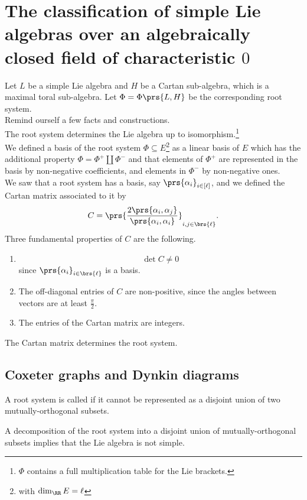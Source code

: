 \documentclass[10pt,a4paper,twoside,openany,hidelinks]{book}
\begin{document}
\chapter{The classification of simple Lie algebras over an algebraically closed field of characteristic $0$}

Let $L$ be a simple Lie algebra and $H$ be a Cartan sub-algebra, which is a maximal toral sub-algebra. Let $\Phi = \Phi\prs{L,H}$ be the corresponding root system.\\
Remind ourself a few facts and constructions.\\
The root system determines the Lie algebra up to isomorphism.\footnote{$\Phi$ contains a full multiplication table for the Lie brackets.}\\
We defined a basis of the root system $\Phi \subseteq E$\footnote{with $\dim_{\RR} E = \ell$} as a linear basis of $E$ which has the additional property $\Phi = \Phi^+ \amalg \Phi^-$ and that elements of $\Phi^+$ are represented in the basis by non-negative coefficients, and elements in $\Phi^-$ by non-negative ones.\\
We saw that a root system has a basis, say $\prs{\alpha_i}_{i\in[\ell]}$, and we defined the Cartan matrix associated to it by
\[C = \prs{\frac{2 \prs{\alpha_i, \alpha_j}}{\prs{\alpha_i, \alpha_i}}}_{i,j \in \brs{\ell}} \text{.}\]
Three fundamental properties of $C$ are the following.
\begin{enumerate}[label = \alph*)]
\item \[\det C \neq 0\]
since $\prs{\alpha_i}_{i \in \brs{\ell}}$ is a basis.
\item The off-diagonal entries of $C$ are non-positive, since the angles between vectors are at least $\frac{\pi}{2}$.
\item The entries of the Cartan matrix are integers.
\end{enumerate}

\begin{fact}
The Cartan matrix determines the root system.
\end{fact}

\section{Coxeter graphs and Dynkin diagrams}

\begin{definition}
A root system is called  if it cannot be represented as a disjoint union of two mutually-orthogonal subsets.
\end{definition}
\begin{exercise}
A decomposition of the root system into a disjoint union of mutually-orthogonal subsets implies that the Lie algebra is not simple.
\end{exercise}
\end{document}
